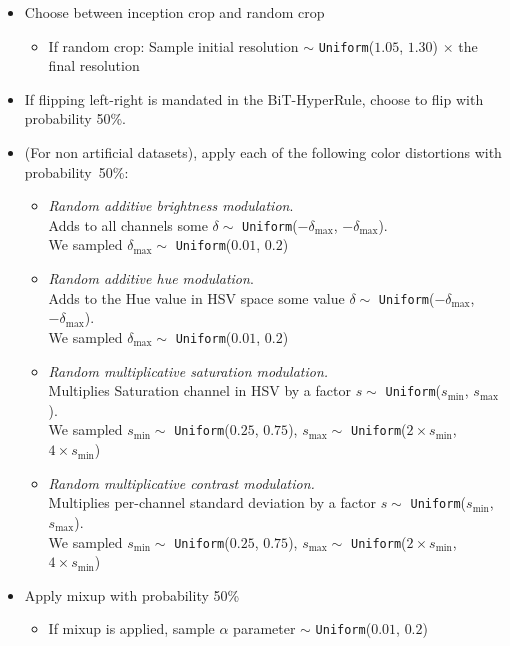 \documentclass{article} \usepackage{iclr2021_conference,times}
\begin{document}
\begin{itemize}
    \item Choose between inception crop and random crop
    \begin{itemize}
        \item If random crop: Sample initial resolution $\sim$ \texttt{Uniform}($1.05$, $1.30$) $\times$ the final resolution
    \end{itemize}
    \item If flipping left-right is mandated in the BiT-HyperRule, choose to flip with probability 50\%.
    \item (For non artificial datasets), apply each of the following color distortions with probability~50\%:
    \begin{itemize}
        \item \textit{Random additive brightness modulation}.\\
        Adds to all channels some $\delta \sim$ \texttt{Uniform}($-\delta_\textrm{max}$, $-\delta_\textrm{max}$).\\
        We sampled $\delta_\textrm{max} \sim$ \texttt{Uniform}($0.01$, $0.2$)
        \item \textit{Random additive hue modulation}.\\
        Adds to the Hue value in HSV space some value $\delta \sim$ \texttt{Uniform}($-\delta_\textrm{max}$, $-\delta_\textrm{max}$).\\
        We sampled $\delta_\textrm{max} \sim$ \texttt{Uniform}($0.01$, $0.2$)
        \item \textit{Random multiplicative saturation modulation.}\\
        Multiplies Saturation channel in HSV by a factor $s \sim $ \texttt{Uniform}($s_\textrm{min}$, $s_\textrm{max}$). \\ We sampled $s_\textrm{min} \sim$ \texttt{Uniform}($0.25$, $0.75$), $s_\textrm{max} \sim$ \texttt{Uniform}($2\times s_\textrm{min}$, $4\times s_\textrm{min}$)
        \item \textit{Random multiplicative contrast modulation.}\\
        Multiplies per-channel standard deviation by a factor $s \sim $ \texttt{Uniform}($s_\textrm{min}$, $s_\textrm{max}$). \\ We sampled $s_\textrm{min} \sim$ \texttt{Uniform}($0.25$, $0.75$), $s_\textrm{max} \sim$ \texttt{Uniform}($2\times s_\textrm{min}$, $4\times s_\textrm{min}$)
    \end{itemize}
    \item Apply mixup with probability 50\%
    \begin{itemize}
        \item If mixup is applied, sample $\alpha$ parameter $\sim$ \texttt{Uniform}($0.01$, $0.2$)
    \end{itemize}
\end{itemize}
\end{document}
